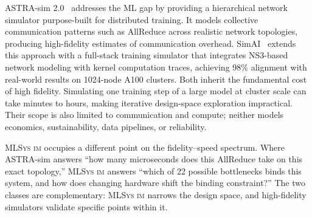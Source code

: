 \documentclass[10pt,twocolumn]{article}
\newcommand{\mlsysim}{\mbox{\textsc{MLSys}\,\textperiodcentered\,\textsc{im}}\xspace}
\begin{document}
ASTRA-sim 2.0~\citep{won2023} addresses the ML gap by providing a hierarchical network simulator purpose-built for distributed training. It models collective communication patterns such as AllReduce across realistic network topologies, producing high-fidelity estimates of communication overhead. SimAI~\citep{wang2025simai} extends this approach with a full-stack training simulator that integrates NS3-based network modeling with kernel computation traces, achieving 98\% alignment with real-world results on 1024-node A100 clusters. Both inherit the fundamental cost of high fidelity. Simulating one training step of a large model at cluster scale can take minutes to hours, making iterative design-space exploration impractical. Their scope is also limited to communication and compute; neither models economics, sustainability, data pipelines, or reliability.

\mlsysim occupies a different point on the fidelity--speed spectrum. Where ASTRA-sim answers ``how many microseconds does this AllReduce take on this exact topology,'' \mlsysim answers ``which of 22 possible bottlenecks binds this system, and how does changing hardware shift the binding constraint?'' The two classes are complementary: \mlsysim narrows the design space, and high-fidelity simulators validate specific points within it.
\end{document}
